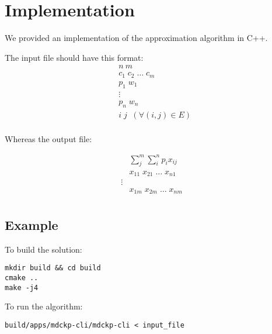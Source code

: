 \documentclass[]{article}
\begin{document}
\section{Implementation}
We provided an implementation of the approximation algorithm in C++. 

The input file should have this format:
\begin{align*}
&n\ m								    \\
&c_1 \; c_2 \; \dots \; c_m			    \\
&p_1 \; w_1							    \\
& \vdots							    \\
&p_n \; w_n							    \\
& i \; j \; \;	(\forall (i,j)\in E)	\\
\end{align*}

Whereas the output file:

\begin{align*}
&\sum_j^m \sum_i^n p_i x_{ij}			\\
&x_{11} \; x_{21} \; \dots \; x_{n1}    \\
\vdots									\\
&x_{1m} \; x_{2m} \; \dots \; x_{nm}    \\
\end{align*}

\subsection{Example}

To build the solution:
\begin{verbatim}
mkdir build && cd build
cmake ..
make -j4
\end{verbatim}

To run the algorithm:
\begin{verbatim}
build/apps/mdckp-cli/mdckp-cli < input_file
\end{verbatim}


\printbibliography
\end{document}
